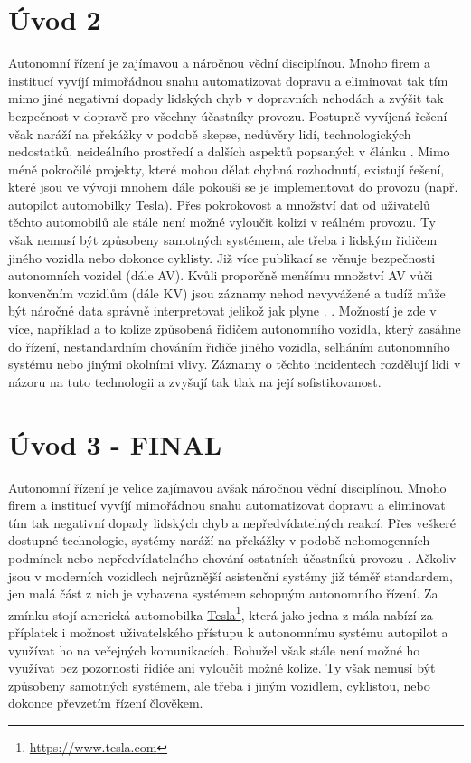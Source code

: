 \documentclass[czech, bc, kky, he, iso690alph]{fasthesis}
\begin{document}
 	\chapter{Úvod 2}
		Autonomní řízení je zajímavou a náročnou vědní disciplínou. Mnoho firem a institucí vyvíjí mimořádnou snahu automatizovat dopravu a eliminovat tak tím mimo jiné negativní dopady lidských chyb v dopravních nehodách a zvýšit tak bezpečnost v dopravě pro všechny účastníky provozu. Postupně vyvíjená řešení však naráží na překážky v podobě skepse, nedůvěry lidí, technologických nedostatků, neideálního prostředí a dalších aspektů popsaných v článku \cite{autopilot}. Mimo méně pokročilé projekty, které mohou dělat chybná rozhodnutí, existují řešení, které jsou ve vývoji mnohem dále pokouší se je implementovat do provozu (např. autopilot automobilky Tesla). Přes pokrokovost a množství dat od uživatelů těchto automobilů ale stále není možné vyloučit kolizi v reálném provozu. Ty však nemusí být způsobeny samotných systémem, ale třeba i lidským řidičem jiného vozidla nebo dokonce cyklisty. Již více publikací se věnuje bezpečnosti autonomních vozidel (dále AV). Kvůli proporčně menšímu množství AV vůči konvenčním vozidlům (dále KV) jsou záznamy nehod nevyvážené a tudíž může být náročné data správně interpretovat jelikož jak plyne . . Možností je zde v více, například a to kolize způsobená řidičem autonomního vozidla, který zasáhne do řízení, nestandardním chováním řidiče jiného vozidla, selháním autonomního systému nebo jinými okolními vlivy. Záznamy o těchto incidentech rozdělují lidi v názoru na tuto technologii a zvyšují tak tlak na její sofistikovanost.
	\chapter{Úvod 3 - FINAL}
		Autonomní řízení je velice zajímavou avšak náročnou vědní disciplínou. Mnoho firem a institucí vyvíjí mimořádnou snahu automatizovat dopravu a eliminovat tím tak negativní dopady lidských chyb a nepředvídatelných reakcí. Přes veškeré dostupné technologie, systémy naráží na překážky v podobě nehomogenních podmínek \cite{VIOLET} nebo nepředvídatelného chování ostatních účastníků provozu \cite{AV_crashes_involved_vulnerable, AV_vs_CV_crashes}. Ačkoliv jsou v moderních vozidlech nejrůznější asistenční systémy již téměř standardem, jen malá část z nich je vybavena systémem schopným autonomního řízení. Za zmínku stojí americká automobilka \href{https://www.tesla.com}{Tesla}\footnote{\href{https://www.tesla.com}{https://www.tesla.com}}, která jako jedna z mála nabízí za příplatek i možnost uživatelského přístupu k autonomnímu systému autopilot a využívat ho na veřejných komunikacích. Bohužel však stále není možné ho využívat bez pozornosti řidiče ani vyloučit možné kolize. Ty však nemusí být způsobeny samotných systémem, ale třeba i jiným vozidlem, cyklistou, nebo dokonce převzetím řízení člověkem.
		
\end{document}
